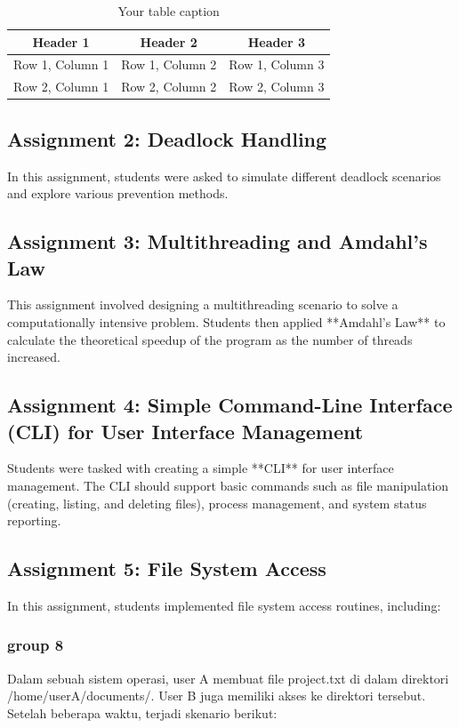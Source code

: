 \documentclass[12pt]{article}
\begin{document}
\begin{table}[htbp] %
    \centering
    \begin{tabular}{|c|c|c|} %
    \hline
    Header 1 & Header 2 & Header 3 \\ %
    \hline
    Row 1, Column 1 & Row 1, Column 2 & Row 1, Column 3 \\ %
    \hline
    Row 2, Column 1 & Row 2, Column 2 & Row 2, Column 3 \\ %
    \hline
    \end{tabular}
    \caption{Your table caption} %
    \label{tab:your_label} %
\end{table}
\subsection{Assignment 2: Deadlock Handling}
In this assignment, students were asked to simulate different deadlock scenarios and explore various prevention methods.

\subsection{Assignment 3: Multithreading and Amdahl's Law}
This assignment involved designing a multithreading scenario to solve a computationally intensive problem. Students then applied **Amdahl's Law** to calculate the theoretical speedup of the program as the number of threads increased.

\subsection{Assignment 4: Simple Command-Line Interface (CLI) for User Interface Management}
Students were tasked with creating a simple **CLI** for user interface management. The CLI should support basic commands such as file manipulation (creating, listing, and deleting files), process management, and system status reporting.

\subsection{Assignment 5: File System Access}
In this assignment, students implemented file system access routines, including:
\subsubsection{group 8} 
Dalam sebuah sistem operasi, user A membuat file project.txt di dalam direktori /home/userA/documents/. User B juga memiliki akses ke direktori tersebut. Setelah beberapa waktu, terjadi skenario berikut:
\end{document}
